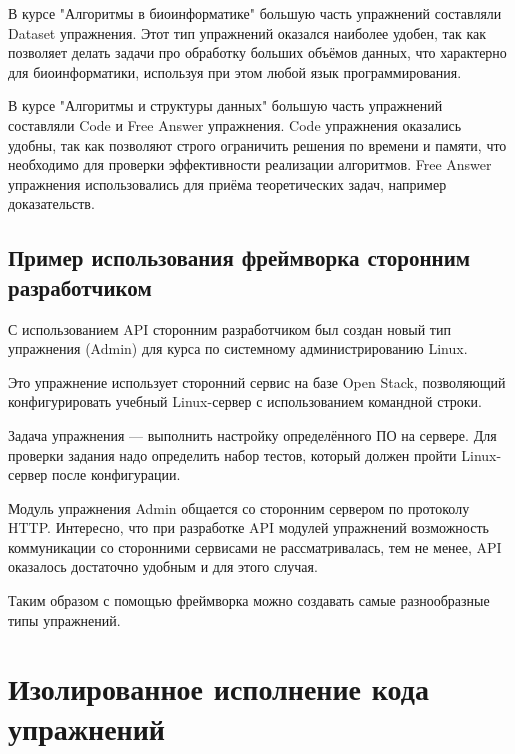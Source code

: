 \documentclass{matmex-diploma-custom}
\begin{document}
В курсе "Алгоритмы в биоинформатике" большую часть упражнений
составляли Dataset упражнения. Этот тип упражнений оказался наиболее
удобен, так как позволяет делать задачи про обработку больших объёмов
данных, что характерно для биоинформатики, используя при этом любой
язык программирования.

В курсе "Алгоритмы и структуры данных" большую часть упражнений
составляли Code и Free Answer упражнения. Code упражнения оказались
удобны, так как позволяют строго ограничить решения по времени и
памяти, что необходимо для проверки эффективности реализации
алгоритмов. Free Answer упражнения использовались для приёма
теоретических задач, например доказательств.

\subsection{Пример использования фреймворка сторонним разработчиком}

С использованием API сторонним разработчиком был создан новый тип
упражнения (Admin) для курса по системному администрированию Linux.

Это упражнение использует сторонний сервис на базе Open Stack, позволяющий
конфигурировать учебный Linux-сервер с использованием командной
строки.

Задача упражнения --- выполнить настройку определённого ПО на
сервере. Для проверки задания надо определить набор тестов,
который должен пройти Linux-сервер после конфигурации.

Модуль упражнения Admin общается со сторонним сервером по протоколу
HTTP. Интересно, что при разработке API модулей упражнений возможность
коммуникации со сторонними сервисами не рассматривалась, тем не менее,
API оказалось достаточно удобным и для этого случая.

Таким образом с помощью фреймворка можно создавать самые разнообразные
типы упражнений.

\section{Изолированное исполнение кода упражнений}
\end{document}
